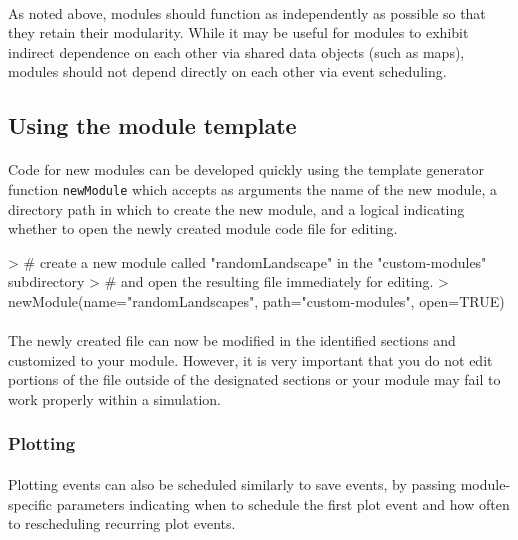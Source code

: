 \documentclass{article}
\begin{document}
\paragraph{}
As noted above, modules should function as independently as possible so that they retain their modularity. While it may be useful for modules to exhibit indirect dependence on each other via shared data objects (such as maps), modules should not depend directly on each other via event scheduling.

\subsection{Using the module template}

\paragraph{}
Code for new modules can be developed quickly using the template generator function \texttt{newModule} which accepts as arguments the name of the new module, a directory path in which to create the new module, and a logical indicating whether to open the newly created module code file for editing.

\begin{Schunk}
\begin{Sinput}
> # create a new module called "randomLandscape" in the "custom-modules" subdirectory
> # and open the resulting file immediately for editing.
> newModule(name="randomLandscapes", path="custom-modules", open=TRUE)
\end{Sinput}
\end{Schunk}

\paragraph{}
The newly created file can now be modified in the identified sections and customized to your module. However, it is very important that you do not edit portions of the file outside of the designated sections or your module may fail to work properly within a simulation.

\subsubsection{Plotting}

\paragraph{}
Plotting events can also be scheduled similarly to save events, by passing module-specific parameters indicating when to schedule the first plot event and how often to rescheduling recurring plot events.
\end{document}
